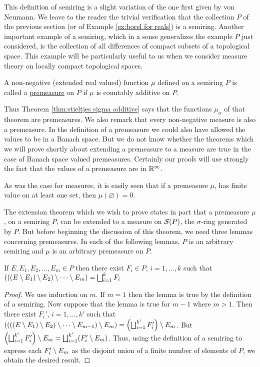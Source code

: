 This definition of semiring is a slight variation of the one first given by von Neumann. We leave to the reader the trivial verification that the collection $P$ of the previous section (or of Example \ref{ex:borel for reals}) is a semiring. Another important example of a semiring, which in a sense generalizes the example $P$ just considered, is the collection of all differences of compact subsets of a topological space. This example will be particularly useful to us when we consider measure theory on locally compact topological spaces.

\begin{definition}
A non-negative (extended real valued) function $\mu$ defined on a semiring $P$ is called a \underline{premeasure} on $P$ if $\mu$ is countably additive on $P$.
\end{definition}

Thus Theorem \ref{thm:stieltjes sigma additive} says that the functions $\mu_\alpha$ of that theorem are premeasures. We also remark that every non-negative measure is also a premeasure. In the definition of a premeasure we could also have allowed the values to be in a Banach space. But we do not know whether the theorems which we will prove shortly about extending a premeasure to a measure are true in the case of Banach space valued premeasures. Certainly our proofs will use strongly the fact that the values of a premeasure are in $\mathbb{R}^\infty$.

As was the case for measures, it is easily seen that if a premeasure $\mu$, has finite value on at least one set, then $\mu(\varnothing)=0$.

The extension theorem which we wish to prove states in part that a premeasure $\mu$, on a semiring $P$, can be extended to a measure on ${\cal S}(P)$, the $\sigma$-ring generated by $P$. But before beginning the discussion of this theorem, we need three lemmas concerning premeasures. In each of the following lemmas, $P$ is an arbitrary semiring and $\mu$ is an arbitrary premeasure on $P$.

\begin{lemma}
\label{lem:repeated set diff}
If $E, E_1, E_2, \dots, E_m\in P$ then there exist $F_i \in P$, $i=1, \dots, k$ such that $(((E\setminus E_1)\setminus E_2)\setminus \cdots\setminus E_m)=\bigsqcup_{i=1}^k F_i$ 
\end{lemma}

\begin{proof}
We use induction on $m$. If $m=1$ then the lemma is true by the definition of a semiring. Now suppose that the lemma is true for $m-1$ where $m>1$. Then there exist $F_i'$, $i=1, \dots, k'$ such that $((((E\setminus E_1)\setminus E_2)\setminus\cdots\setminus E_{m-1})\setminus E_m)=\left(\bigsqcup_{i=1}^{k'}F_i'\right)\setminus E_m$. But $\left(\bigsqcup_{i=1}^{k'}F_i'\right)\setminus E_m=\bigsqcup_{i=1}^{k'}(F_i'\setminus E_m)$. Thus, using the definition of a semiring to express each $F_i'\setminus E_m$ as the disjoint union of a finite number of elements of $P$, we obtain the desired result.
\end{proof}



